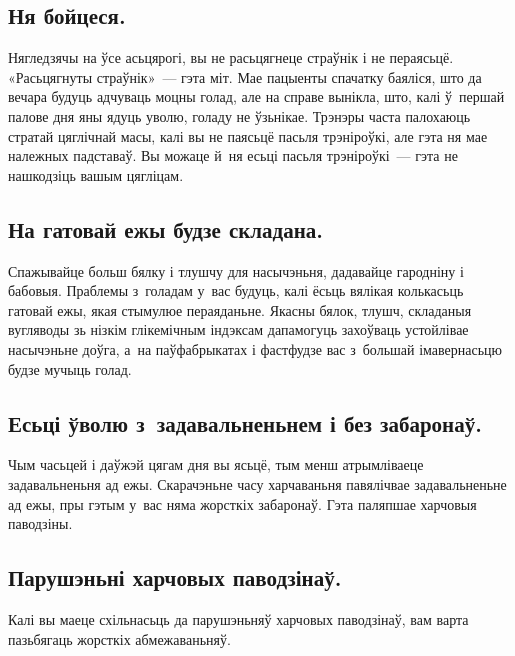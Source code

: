 
\subsection{Ня бойцеся.}
Нягледзячы на ўсе асьцярогі, вы не расьцягнеце страўнік і не пераясьцё. «Расьцягнуты страўнік»~--- гэта міт. Мае пацыенты спачатку баяліся, што да вечара будуць адчуваць моцны голад, але на справе вынікла, што, калі ў~першай палове дня яны ядуць уволю, голаду не ўзьнікае. Трэнэры часта палохаюць стратай цяглічнай масы, калі вы не паясьцё пасьля трэніроўкі, але гэта ня мае належных падставаў. Вы можаце й~ня есьці пасьля трэніроўкі~--- гэта не нашкодзіць вашым цягліцам.

\subsection{На гатовай ежы будзе складана.}
Спажывайце больш бялку і тлушчу для насычэньня, дадавайце гародніну і бабовыя. Праблемы з~голадам у~вас будуць, калі ёсьць вялікая колькасьць гатовай ежы, якая стымулюе пераяданьне. Якасны бялок, тлушч, складаныя вугляводы зь нізкім глікемічным індэксам дапамогуць захоўваць устойлівае насычэньне доўга, а~на паўфабрыкатах і фастфудзе вас з~большай імавернасьцю будзе мучыць голад.

\subsection{Есьці ўволю з~задавальненьнем і без забаронаў.}
Чым часьцей і даўжэй цягам дня вы ясьцё, тым менш атрымліваеце задавальненьня ад ежы. Скарачэньне часу харчаваньня павялічвае задавальненьне ад ежы, пры гэтым у~вас няма жорсткіх забаронаў. Гэта паляпшае харчовыя паводзіны.

\subsection{Парушэньні харчовых паводзінаў.}
Калі вы маеце схільнасьць да парушэньняў харчовых паводзінаў, вам варта пазьбягаць жорсткіх абмежаваньняў.
